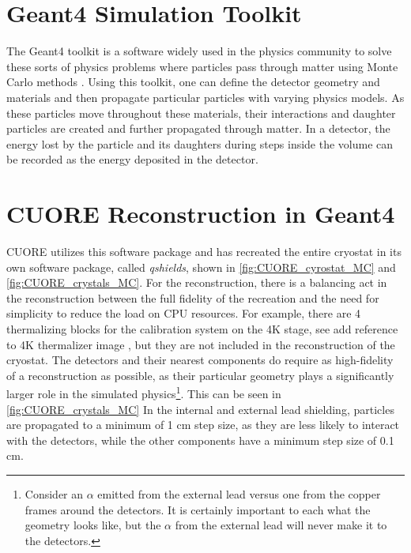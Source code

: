 \section{Geant4 Simulation Toolkit}
The Geant4 toolkit is a software widely used in the physics community to solve these sorts of physics problems where particles pass through matter using Monte Carlo methods \cite{AGOSTINELLI2003250, 528223, ALLISON2016186}.
Using this toolkit, one can define the detector geometry and materials and then propagate particular particles with varying physics models.
As these particles move throughout these materials, their interactions and daughter particles are created and further propagated through matter.
In a detector, the energy lost by the particle and its daughters during steps inside the volume can be recorded as the energy deposited in the detector.

\section{CUORE Reconstruction in Geant4}
CUORE utilizes this software package and has recreated the entire cryostat in its own software package, called \textit{qshields}, shown in \autoref{fig:CUORE_cyrostat_MC} and \autoref{fig:CUORE_crystals_MC}.
For the reconstruction, there is a balancing act in the reconstruction between the full fidelity of the recreation and the need for simplicity to reduce the load on CPU resources.
For example, there are 4 thermalizing blocks for the calibration system on the 4K stage, see \color{red}add reference to 4K thermalizer image \color{black}, but they are not included in the reconstruction of the cryostat.
The detectors and their nearest components do require as high-fidelity of a reconstruction as possible, as their particular geometry plays a significantly larger role in the simulated physics\footnote{Consider an $\alpha$ emitted from the external lead versus one from the copper frames around the detectors.
It is certainly important to each what the geometry looks like, but the $\alpha$ from the external lead will never make it to the detectors.}.
This can be seen in \autoref{fig:CUORE_crystals_MC}
In the internal and external lead shielding, particles are propagated to a minimum of 1 cm step size, as they are less likely to interact with the detectors, while the other components have a minimum step size of 0.1 cm.

